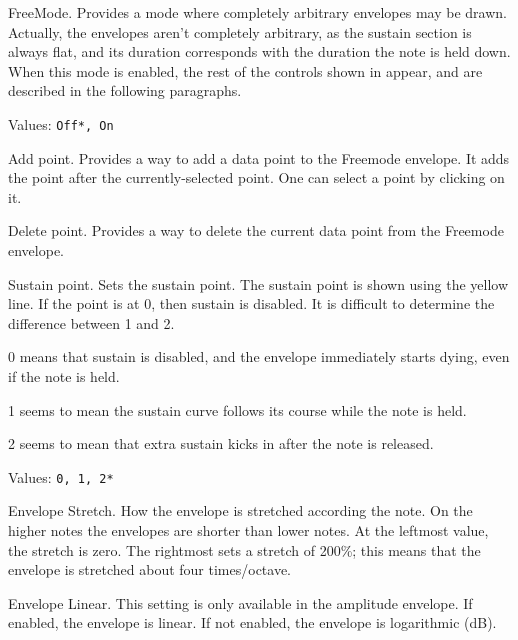    FreeMode.  Provides a mode where completely arbitrary envelopes may be
   drawn.
   Actually, the envelopes aren't completely arbitrary, as the sustain
   section is always flat, and its duration corresponds with the duration
   the note is held down.
   When this mode is enabled, the rest of the controls shown in
   \hspace{4pt}appear, and are
   described in the following paragraphs.

   Values: \texttt{Off*, On}

   Add point.
   Provides a way to add a data point to the Freemode envelope.
   It adds the point after the currently-selected point. One can select a
   point by clicking on it.

   Delete point.
   Provides a way to delete the current data point from the Freemode envelope.

   Sustain point.
   Sets the sustain point.
   The sustain point is shown using the yellow line.
   If the point is at 0, then sustain is disabled.
   It is difficult to determine the difference between 1 and 2.

   \begin{enumber}
      \item{0} means that sustain is disabled, and the envelope immediately
      starts dying, even if the note is held.
      \item{1} seems to mean the sustain curve follows its course while the
      note is held.
      \item{2} seems to mean that extra sustain kicks in after the note is
      released.
   \end{enumber}

   Values: \texttt{0, 1, 2*}

   Envelope Stretch.
   How the envelope is stretched according the note. On the higher notes the
   envelopes are shorter than lower notes. At the leftmost value, the
   stretch is zero. The rightmost sets a stretch of 200\%; this means that the
   envelope is stretched about four times/octave.

   Envelope Linear.
   This setting is only available in the amplitude envelope.
   If enabled, the envelope is linear.
   If not enabled, the envelope is logarithmic (dB).

